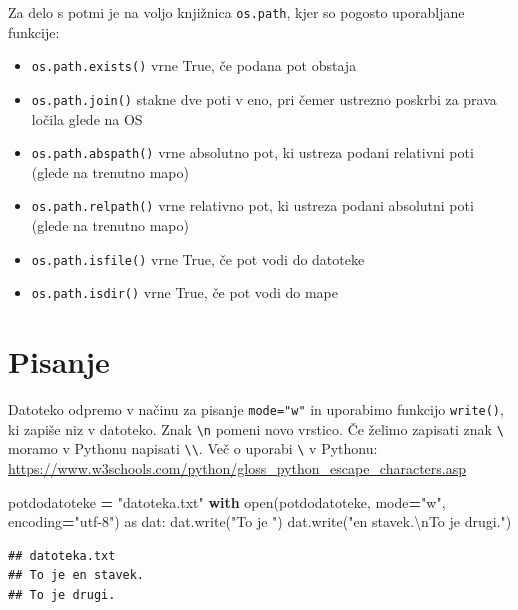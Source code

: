\documentclass[
]{report}
\newenvironment{Shaded}{\begin{snugshade}}{\end{snugshade}}
\newcommand{\BuiltInTok}[1]{#1}
\newcommand{\CharTok}[1]{\textcolor[rgb]{0.31,0.60,0.02}{#1}}
\newcommand{\ControlFlowTok}[1]{\textcolor[rgb]{0.13,0.29,0.53}{\textbf{#1}}}
\newcommand{\ImportTok}[1]{#1}
\newcommand{\NormalTok}[1]{#1}
\newcommand{\OperatorTok}[1]{\textcolor[rgb]{0.81,0.36,0.00}{\textbf{#1}}}
\newcommand{\StringTok}[1]{\textcolor[rgb]{0.31,0.60,0.02}{#1}}
\providecommand{\tightlist}{%
  \setlength{\itemsep}{0pt}\setlength{\parskip}{0pt}}
\begin{document}
Za delo s potmi je na voljo knjižnica \texttt{os.path}, kjer so pogosto uporabljane funkcije:

\begin{itemize}
\tightlist
\item
  \texttt{os.path.exists()} vrne True, če podana pot obstaja
\item
  \texttt{os.path.join()} stakne dve poti v eno, pri čemer ustrezno poskrbi za prava ločila glede na OS
\item
  \texttt{os.path.abspath()} vrne absolutno pot, ki ustreza podani relativni poti (glede na trenutno mapo)
\item
  \texttt{os.path.relpath()} vrne relativno pot, ki ustreza podani absolutni poti (glede na trenutno mapo)
\item
  \texttt{os.path.isfile()} vrne True, če pot vodi do datoteke
\item
  \texttt{os.path.isdir()} vrne True, če pot vodi do mape
\end{itemize}

\hypertarget{pisanje}{%
\section{Pisanje}\label{pisanje}}

Datoteko odpremo v načinu za pisanje \texttt{mode="w"} in uporabimo funkcijo \texttt{write()},
ki zapiše niz v datoteko. Znak \texttt{\textbackslash{}n} pomeni novo vrstico. Če želimo zapisati znak \texttt{\textbackslash{}} moramo v Pythonu napisati \texttt{\textbackslash{}\textbackslash{}}. Več o uporabi \texttt{\textbackslash{}} v Pythonu: \url{https://www.w3schools.com/python/gloss_python_escape_characters.asp}

\begin{Shaded}
\begin{Highlighting}[]
\NormalTok{potdodatoteke }\OperatorTok{=} \StringTok{"datoteka.txt"}
\ControlFlowTok{with} \BuiltInTok{open}\NormalTok{(potdodatoteke, mode}\OperatorTok{=}\StringTok{"w"}\NormalTok{, encoding}\OperatorTok{=}\StringTok{"utf{-}8"}\NormalTok{) }\ImportTok{as}\NormalTok{ dat:}
\NormalTok{    dat.write(}\StringTok{"To je "}\NormalTok{)}
\NormalTok{    dat.write(}\StringTok{"en stavek.}\CharTok{\textbackslash{}n}\StringTok{To je drugi."}\NormalTok{)}
\end{Highlighting}
\end{Shaded}

\begin{verbatim}
## datoteka.txt
## To je en stavek.
## To je drugi.
\end{verbatim}
\end{document}
